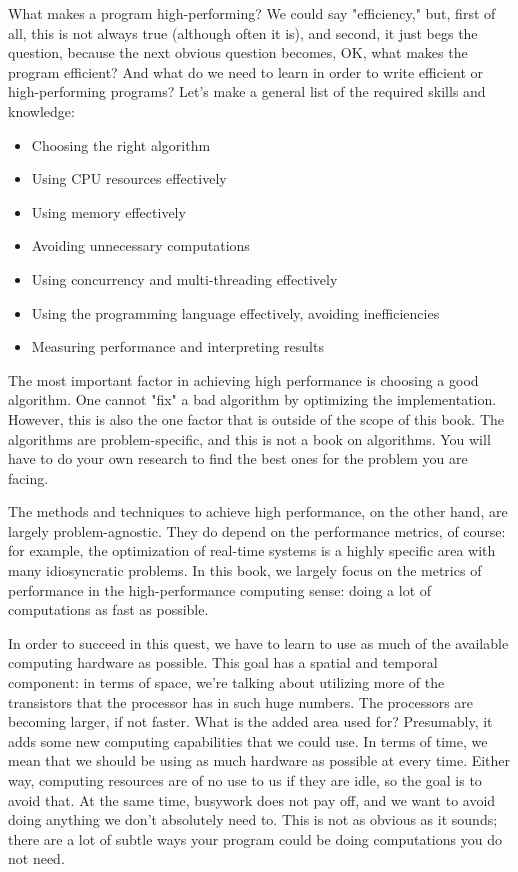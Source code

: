 What makes a program high-performing? We could say "efficiency," but, first of all, this is not always true (although often it is), and second, it just begs the question, because the next obvious question becomes, OK, what makes the program efficient? And what do we need to learn in order to write efficient or high-performing programs? Let's make a general list of the required skills and knowledge:

\begin{itemize}
\item Choosing the right algorithm
\item Using CPU resources effectively
\item Using memory effectively
\item Avoiding unnecessary computations
\item Using concurrency and multi-threading effectively
\item Using the programming language effectively, avoiding inefficiencies
\item Measuring performance and interpreting results
\end{itemize}

The most important factor in achieving high performance is choosing a good algorithm. One cannot "fix" a bad algorithm by optimizing the implementation. However, this is also the one factor that is outside of the scope of this book. The algorithms are problem-specific, and this is not a book on algorithms. You will have to do your own research to find the best ones for the problem you are facing.

The methods and techniques to achieve high performance, on the other hand, are largely problem-agnostic. They do depend on the performance metrics, of course: for example, the optimization of real-time systems is a highly specific area with many idiosyncratic problems. In this book, we largely focus on the metrics of performance in the high-performance computing sense: doing a lot of computations as fast as possible.

In order to succeed in this quest, we have to learn to use as much of the available computing hardware as possible. This goal has a spatial and temporal component: in terms of space, we're talking about utilizing more of the transistors that the processor has in such huge numbers. The processors are becoming larger, if not faster. What is the added area used for? Presumably, it adds some new computing capabilities that we could use. In terms of time, we mean that we should be using as much hardware as possible at every time. Either way, computing resources are of no use to us if they are idle, so the goal is to avoid that. At the same time, busywork does not pay off, and we want to avoid doing anything we don't absolutely need to. This is not as obvious as it sounds; there are a lot of subtle ways your program could be doing computations you do not need. 


